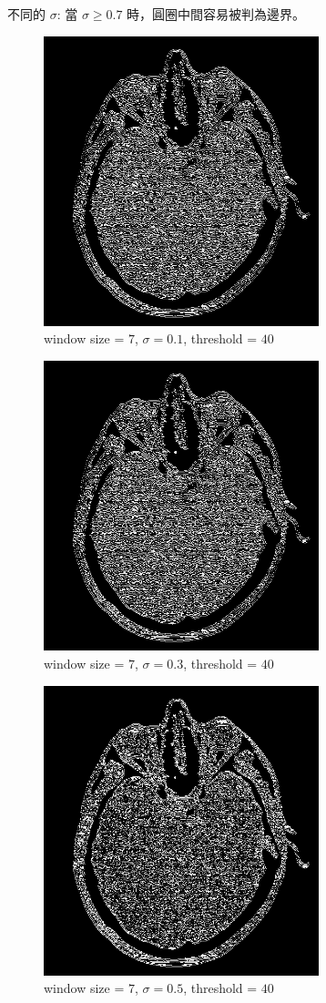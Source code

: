\documentclass[conference]{IEEEtran}
\begin{document}
不同的 $\sigma$: 當 $\sigma \geq 0.7$ 時，圓圈中間容易被判為邊界。


\begin{figure}[H]
\centerline{\includegraphics[width=8cm]{headCT04.png}}
\caption{window size = $7$, $\sigma=0.1$,  threshold = $40$}
\label{headCT04}
\end{figure}

\begin{figure}[H]
\centerline{\includegraphics[width=8cm]{headCT05.png}}
\caption{window size = $7$, $\sigma=0.3$,  threshold = $40$}
\label{headCT05}
\end{figure}

\begin{figure}[H]
\centerline{\includegraphics[width=8cm]{headCT06.png}}
\caption{window size = $7$, $\sigma=0.5$,  threshold = $40$}
\label{headCT06}
\end{figure}
\end{document}

